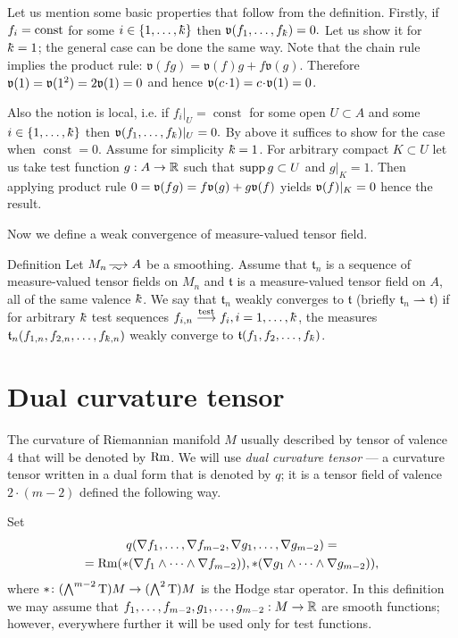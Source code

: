 Let us mention some basic properties that follow 
from the definition.
Firstly, if $f_i=\mathrm{const}$  for some $i\in\{1,\dots,\kay\}$ 
then $\mathfrak{v}(f_1,\dots,f_\kay)=0.$
Let us show it for $\kay=1$; the general case can be done the same way.
Note that the chain rule implies the
product rule:
$\mathfrak{v}(fg)=\mathfrak{v}(f)g+f\mathfrak{v}(g)$.
Therefore $\mathfrak{v}(1)=\mathfrak{v}(1^2)=2\mathfrak{v}(1)=0$ and hence
$\vv(c\cdot 1)=c\cdot\vv(1)=0$.



Also the notion is local,
i.e. if $f_i|_{U}=\operatorname{const}$
for some open $U\subset A$ and some $i\in\{1,\dots,\kay\}$ 
 then $\mathfrak{v}(f_1,\dots,f_\kay)|_U=0.$
By above it suffices to show
for the case when $\operatorname{const}=0$.
Assume for simplicity  $\kay=1$. 
For arbitrary compact $K\subset U$  let
us take test function $g:A\to\mathbb{R}$ such that
$\operatorname{supp} g\subset U$ and $g|_K=1$. Then applying product rule
 $0=\mathfrak{v}(fg)=f\mathfrak{v}(g)+g\mathfrak{v}(f)$ yields 
$\mathfrak{v}(f)|_K=0$ hence 
 the result.
 




Now we define a weak convergence of measure-valued tensor field.

\begin{rdef} {Definition}
Let $M_n\smooths{} A$ be a smoothing.
Assume that $\mathfrak{t}_n$ is a sequence of %
 measure-valued tensor fields on $M_n$  and $\mathfrak{t}$ is a
measure-valued tensor field on $A$,
all of the same valence $\kay$.
We say that $\mathfrak{t}_n$ weakly converges to  $\mathfrak{t}$
(briefly $\mathfrak{t}_n\rightharpoonup\mathfrak{t}$) if for arbitrary $\kay$
test sequences 
$f_{i,n}\testto f_i, i=1,\dots,\kay$, the measures $\mathfrak{t}_n(f_{1,n},f_{2,n},\dots,f_{\kay,n})$ weakly converge to $\mathfrak{t}(f_{1},f_{2},\dots,f_{\kay})$.
\end{rdef}

\section{Dual curvature tensor}

The curvature of Riemannian manifold $M$ usually described by tensor of valence 4 that will be denoted by $\operatorname{Rm}$.
We will use \emph{dual curvature tensor} --- 
a curvature tensor written in a dual form that is denoted by $q$;
it is a tensor field of valence $2\cdot(m-2)$ defined the following way.

Set
\begin{multline*}
q(\nabla f_1,\dots,\nabla f_{m-2},\nabla g_1,\dots,\nabla g_{m-2})
=
\\
= 
\operatorname{Rm}(*(\nabla f_1\wedge\dots\wedge \nabla f_{m-2})), *(\nabla g_1\wedge\dots\wedge \nabla g_{m-2})),
\end{multline*}
where ${*}\colon(\bigwedge^{m-2}\mathrm{T})M\to(\bigwedge^2\mathrm{T})M$ is the  Hodge star operator.
In this definition we may assume that $f_1,\dots,f_{m-2},g_1,\dots,g_{m-2}:M\to\mathbb{R}$ are smooth functions; however, everywhere further it will be used only for test functions.

